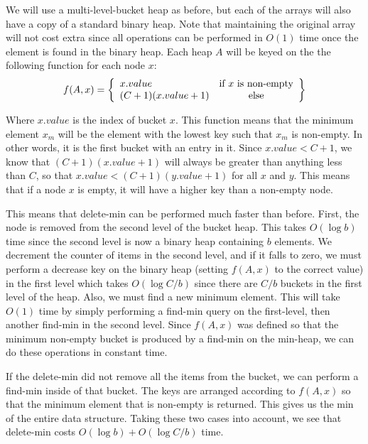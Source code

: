 \documentclass[psamsfonts]{amsart}
\newenvironment{sol}{\vspace{0.25cm}{\large \bfseries Solution:}}{\qedsymbol}
\begin{document}
\begin{sol}
We will use a multi-level-bucket heap as before, but each of the arrays will also have a copy of a standard binary heap. Note that maintaining the original array will not cost extra since all operations can be performed in $O(1)$ time once the element is found in the binary heap. Each heap $A$ will be keyed on the the following function for each node $x$:
\begin{equation}
f(A, x) = \left\{ \begin{array}{l c}
x.value & \text{if $x$ is non-empty} \\
(C + 1)(x.value+1) & \text{else} 
\end{array}
\right\}
\end{equation}

Where $x.value$ is the index of bucket $x$. This function means that the minimum element $x_m$ will be the element with the lowest key such that $x_m$ is non-empty. In other words, it is the first bucket with an entry in it. Since $x.value < C + 1$, we know that $(C+1)(x.value + 1)$ will always be greater than anything less than $C$, so that $x.value < (C+1)(y.value + 1)$ for all $x$ and $y$. This means that if a node $x$ is empty, it will have a higher key than a non-empty node. 

This means that delete-min can be performed much faster than before. First, the node is removed from the second level of the bucket heap. This takes $O(\log b)$ time since the second level is now a binary heap containing $b$ elements. We decrement the counter of items in the second level, and if it falls to zero, we must perform a decrease key on the binary heap (setting $f(A,x)$ to the correct value) in the first level which takes $O(\log C/b)$ since there are $C/b$ buckets in the first level of the heap. Also, we must find a new minimum element. This will take $O(1)$ time by simply performing a find-min query on the first-level, then another find-min in the second level. Since $f(A,x)$ was defined so that the minimum non-empty bucket is produced by a find-min on the min-heap, we can do these operations in constant time.

If the delete-min did not remove all the items from the bucket, we can perform a find-min inside of that bucket. The keys are arranged according to $f(A,x)$ so that the minimum element that is non-empty is returned. This gives us the min of the entire data structure. Taking these two cases into account, we see that delete-min costs $O(\log b) + O(\log C/b)$ time. 


\end{sol}
\end{document}
